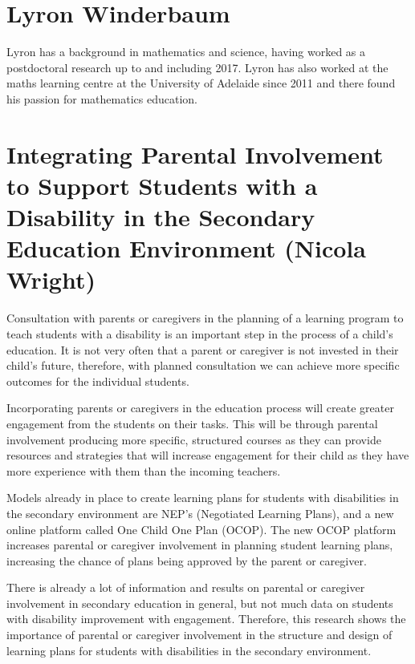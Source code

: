 \documentclass[twoside,12pt,a4paper,notitlepage]{memoir}
\begin{document}
\section*{Lyron Winderbaum}

Lyron has a background in mathematics and science, having worked as a postdoctoral research up to and including 2017. Lyron has also worked at the maths learning centre at the University of Adelaide since 2011 and there found his passion for mathematics education.


\pagebreak
\section*{Integrating Parental Involvement to Support Students with a Disability in the Secondary Education Environment (Nicola Wright)}
\label{aut:wright}


Consultation with parents or caregivers in the planning of a learning program to teach students with a disability is an important step in the process of a child’s education. It is not very often that a parent or caregiver is not invested in their child’s future, therefore, with planned consultation we can achieve more specific outcomes for the individual students.

Incorporating parents or caregivers in the education process will create greater engagement from the students on their tasks. This will be through parental involvement producing more specific, structured courses as they can provide resources and strategies that will increase engagement for their child as they have more experience with them than the incoming teachers.

Models already in place to create learning plans for students with disabilities in the secondary environment are NEP’s (Negotiated Learning Plans), and a new online platform called One Child One Plan (OCOP). The new OCOP platform increases parental or caregiver involvement in planning student learning plans, increasing the chance of plans being approved by the parent or caregiver.

There is already a lot of information and results on parental or caregiver involvement in secondary education in general, but not much data on students with disability improvement with engagement. Therefore, this research shows the importance of parental or caregiver involvement in the structure and design of learning plans for students with disabilities in the secondary environment.
\end{document}
